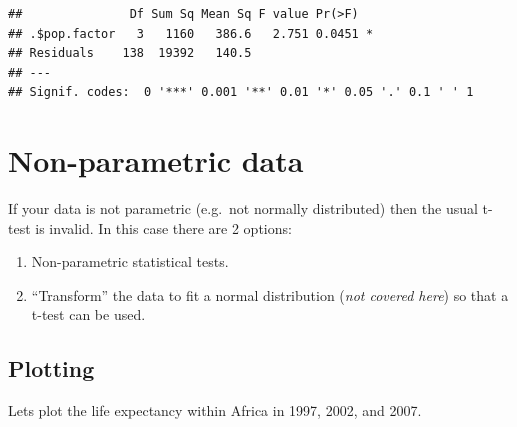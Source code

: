 \documentclass[]{book}
\makeatletter
\newenvironment{Shaded}{\begin{snugshade}}{\end{snugshade}}
\newcommand{\DataTypeTok}[1]{\textcolor[rgb]{0.13,0.29,0.53}{#1}}
\newcommand{\DecValTok}[1]{\textcolor[rgb]{0.00,0.00,0.81}{#1}}
\newcommand{\KeywordTok}[1]{\textcolor[rgb]{0.13,0.29,0.53}{\textbf{#1}}}
\newcommand{\NormalTok}[1]{#1}
\newcommand{\OperatorTok}[1]{\textcolor[rgb]{0.81,0.36,0.00}{\textbf{#1}}}
\newcommand{\StringTok}[1]{\textcolor[rgb]{0.31,0.60,0.02}{#1}}
\newenvironment{kframe}{%
\medskip{}
\setlength{\fboxsep}{.8em}
 \def\at@end@of@kframe{}%
 \ifinner\ifhmode%
  \def\at@end@of@kframe{\end{minipage}}%
  \begin{minipage}{\columnwidth}%
 \fi\fi%
 \def\FrameCommand##1{\hskip\@totalleftmargin \hskip-\fboxsep
 \colorbox{shadecolor}{##1}\hskip-\fboxsep
     \hskip-\linewidth \hskip-\@totalleftmargin \hskip\columnwidth}%
 \MakeFramed {\advance\hsize-\width
   \@totalleftmargin\z@ \linewidth\hsize
   \@setminipage}}%
 {\par\unskip\endMakeFramed%
 \at@end@of@kframe}
\renewenvironment{Shaded}{\begin{kframe}}{\end{kframe}}
\theoremstyle{definition}
\theoremstyle{definition}
\theoremstyle{definition}
\theoremstyle{remark}
\makeatother
\begin{document}
\begin{Shaded}
\end{Shaded}

\begin{verbatim}
##               Df Sum Sq Mean Sq F value Pr(>F)  
## .$pop.factor   3   1160   386.6   2.751 0.0451 *
## Residuals    138  19392   140.5                 
## ---
## Signif. codes:  0 '***' 0.001 '**' 0.01 '*' 0.05 '.' 0.1 ' ' 1
\end{verbatim}

\hypertarget{non-parametric-data}{%
\section{Non-parametric data}\label{non-parametric-data}}

If your data is not parametric (e.g.~not normally distributed) then the
usual t-test is invalid. In this case there are 2 options:

\begin{enumerate}
\def\labelenumi{\arabic{enumi}.}
\item
  Non-parametric statistical tests.
\item
  ``Transform'' the data to fit a normal distribution (\emph{not covered
  here}) so that a t-test can be used.
\end{enumerate}

\hypertarget{plotting-2}{%
\subsection{Plotting}\label{plotting-2}}

Lets plot the life expectancy within Africa in 1997, 2002, and 2007.
\end{document}
